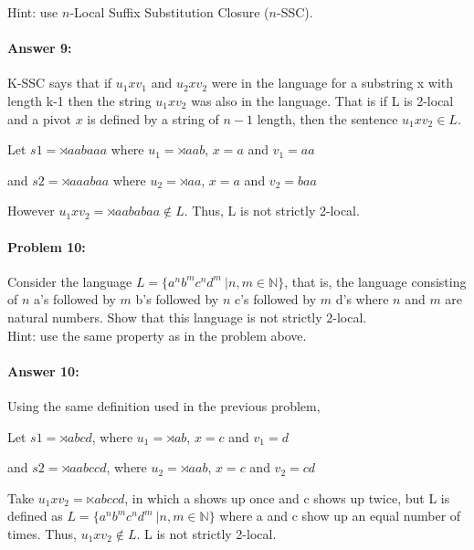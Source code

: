\documentclass[10pt]{article}
\begin{document}
\noindent Hint: use $n$-Local Suffix Substitution Closure ($n$-SSC).

\paragraph{Answer 9:} K-SSC says that if ${u_{1}xv_{1}}$ and ${u_{2}xv_{2}}$ were in the language for a substring x with length k-1 then the string ${u_{1}xv_{2}}$ was also in the language. That is if L is 2-local and a pivot ${x}$ is defined by a string of ${n-1}$ length, then the sentence ${u_{1}xv_{2}} \in L$.

Let $s1 = \rtimes aabaaa$ where $u_1 = \rtimes aab$, $x = a$ and $v_1 = aa$

and $s2 = \rtimes aaabaa$ where $u_2 = \rtimes aa$, $x = a$ and $v_2 = baa$

However $u_1 x v_2 = \rtimes aababaa \notin L$. Thus, L is not strictly 2-local.


\noindent\hrulefill %

\paragraph{Problem 10:}

Consider the language
$L= \{a^n b^m c^n d^m\ | n, m \in \mathbb{N} \}$, that is, the
language consisting of $n$ a's followed by $m$ b's followed by $n$ c's
followed by $m$ d's where $n$ and $m$ are
natural numbers. Show that this language is not strictly $2$-local.\\

\noindent Hint: use the same property as in the problem above.

\paragraph{Answer 10:} Using the same definition used in the previous problem,

Let $s1 = \rtimes abcd$, where $u_1 = \rtimes ab$, $x = c$ and $v_1 = d$

and $s2 = \rtimes aabccd$, where $u_2 = \rtimes aab$, $x = c$ and $v_2 = cd$

Take ${u_{1}xv_{2}}=\ltimes abccd$, in which a shows up once and c shows up twice, but L is defined as $L= \{a^n b^m c^n d^m\ | n, m \in \mathbb{N} \}$ where a and c show up an equal number of times. Thus, ${u_{1}xv_{2}} \notin L$. L is not strictly 2-local.


\noindent\hrulefill %
\end{document}
